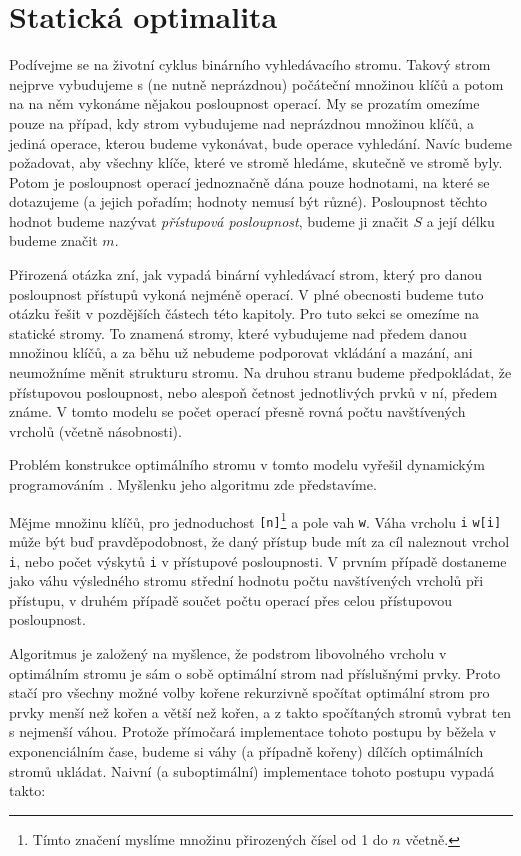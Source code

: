 \section{Statická optimalita}\label{sec:staticoptimality}

Podívejme se na životní cyklus binárního vyhledávacího stromu. Takový strom
nejprve vybudujeme s (ne nutně neprázdnou) počáteční množinou klíčů
a potom na na něm vykonáme nějakou posloupnost operací. My se prozatím omezíme
pouze na případ, kdy strom vybudujeme nad neprázdnou množinou klíčů, a jediná
operace, kterou budeme vykonávat, bude operace vyhledání. Navíc budeme
požadovat, aby všechny klíče, které ve stromě hledáme, skutečně ve stromě byly.
Potom je posloupnost operací jednoznačně dána pouze hodnotami, na které se
dotazujeme (a jejich pořadím; hodnoty nemusí být různé). Posloupnost těchto
hodnot budeme nazývat \emph{přístupová posloupnost}, budeme ji značit $S$ a
její délku budeme značit $m$.

Přirozená otázka zní, jak vypadá binární vyhledávací strom, který pro danou
posloupnost přístupů vykoná nejméně operací. V plné obecnosti budeme tuto otázku řešit v pozdějších částech této kapitoly. Pro tuto sekci se omezíme na statické
stromy. To znamená stromy, které vybudujeme nad předem danou množinou klíčů, a
za běhu už nebudeme podporovat vkládání a mazání, ani neumožníme měnit
strukturu stromu. Na druhou stranu budeme předpokládat, že přístupovou posloupnost, nebo alespoň četnost jednotlivých prvků v ní, předem známe. V tomto modelu se počet operací přesně rovná
počtu navštívených vrcholů (včetně násobnosti).

Problém konstrukce optimálního stromu v tomto modelu vyřešil dynamickým
programováním \citet{staticoptimality}. Myšlenku jeho algoritmu zde představíme.

Mějme množinu klíčů, pro jednoduchost {\tt [n]}\footnote{Tímto značení myslíme
množinu přirozených čísel od 1 do $n$ včetně.} a pole vah {\tt w}. Váha vrcholu
{\tt i} {\tt w[i]} může být buď pravděpodobnost, že daný přístup bude mít za
cíl naleznout vrchol {\tt i}, nebo počet výskytů {\tt i} v přístupové
posloupnosti. V prvním případě dostaneme jako váhu výsledného stromu střední
hodnotu počtu navštívených vrcholů při přístupu, v druhém případě součet počtu operací přes
celou přístupovou posloupnost.

Algoritmus je založený na myšlence, že podstrom libovolného vrcholu v
optimálním stromu je sám o sobě optimální strom nad příslušnými prvky. Proto
stačí pro všechny možné volby kořene rekurzivně spočítat optimální strom pro
prvky menší než kořen a větší než kořen, a z takto spočítaných stromů vybrat
ten s nejmenší váhou. Protože přímočará implementace tohoto postupu by běžela v
exponenciálním čase, budeme si váhy (a případně kořeny) dílčích optimálních
stromů ukládat. Naivní (a suboptimální) implementace tohoto postupu vypadá
takto:

